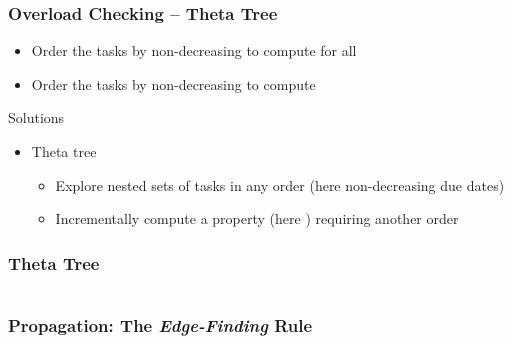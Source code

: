 \begin{frame}
\frametitle{Overload Checking -- Theta Tree}
\begin{itemize}
  \item Order the tasks by non-decreasing  to compute  for all 
  \item Order the tasks by non-decreasing  to compute 
\end{itemize}

\begin{myblock}{Solutions}
  \begin{itemize}
    \item Theta tree 
    \begin{itemize}
      \item Explore nested sets of tasks in any order (here non-decreasing due dates)
      \item Incrementally compute a property (here ) requiring another order
    \end{itemize}
  \end{itemize}
\end{myblock}
\end{frame}


\begin{frame}
\frametitle{Theta Tree}
\begin{columns}

  \begin{colorschedfigure}{.3}
    
  \end{colorschedfigure}




\end{columns}
\end{frame}



\begin{frame}
  \frametitle{Propagation: The \emph{Edge-Finding} Rule}

\vfill 


\vfill  
      
\end{frame}

